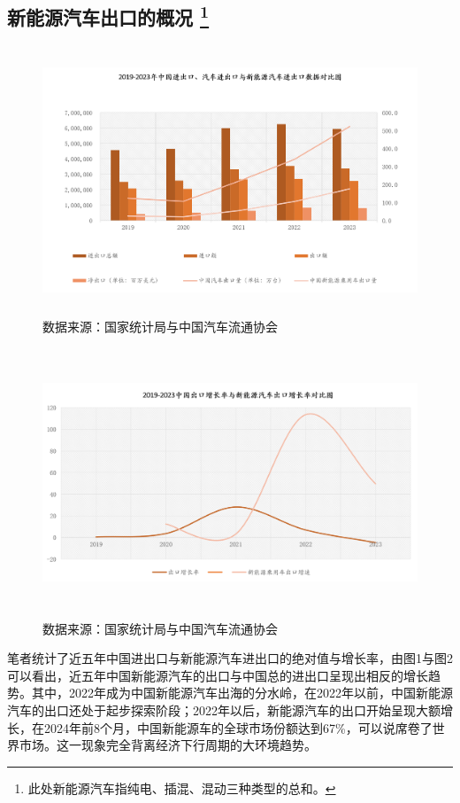 \documentclass[a4paper, 10pt]{article}
\begin{document}
  \subsection{新能源汽车出口的概况 \protect\footnote{此处新能源汽车指纯电、插混、混动三种类型的总和。}}
  \begin{figure}[ht]
    \centering 
    \includegraphics[height=8cm,width=14.5cm]{fg1.png}
    
    \caption{数据来源：国家统计局与中国汽车流通协会}
    \label{1}
    
    \end{figure}
    \begin{figure}[ht]
      \centering 
      \includegraphics[height=8cm,width=14.5cm]{fg2.png}
      
      \caption{数据来源：国家统计局与中国汽车流通协会}
      \label{2}
      
      \end{figure}
    笔者统计了近五年中国进出口与新能源汽车进出口的绝对值与增长率，由图1与图2可以看出，近五年中国新能源汽车的出口与中国总的进出口呈现出相反的增长趋势。其中，2022年成为中国新能源汽车出海的分水岭，在2022年以前，中国新能源汽车的出口还处于起步探索阶段；2022年以后，新能源汽车的出口开始呈现大额增长，在2024年前8个月，中国新能源车的全球市场份额达到67\%，可以说席卷了世界市场。这一现象完全背离经济下行周期的大环境趋势。
\end{document}
